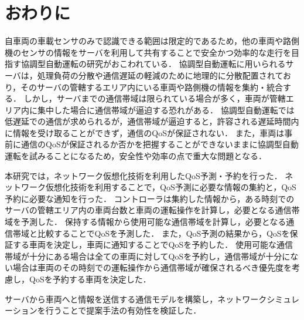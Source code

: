 \documentclass[a4paper,11pt,uplatex]{ujreport}
\begin{document}
  

\chapter{おわりに}
\label{chap:おわりに}


  自車両の車載センサのみで認識できる範囲は限定的であるため，他の車両や路側機のセンサの情報をサーバを利用して共有することで安全かつ効率的な走行を目指す協調型自動運転の研究がおこわれている．
  協調型自動運転に用いられるサーバは，処理負荷の分散や通信遅延の軽減のために地理的に分散配置されており，そのサーバの管轄するエリア内にいる車両や路側機の情報を集約・統合する．
  しかし，サーバまでの通信帯域は限られている場合が多く，車両が管轄エリア内に集中した場合に通信帯域が逼迫する恐れがある．
  協調型自動運転では低遅延での通信が求められるが，通信帯域が逼迫すると，許容される遅延時間内に情報を受け取ることができず，通信のQoSが保証されない．
  また，車両は事前に通信のQoSが保証されるか否かを把握することができないままに協調型自動運転を試みることになるため，安全性や効率の点で重大な問題となる．\par
  本研究では，ネットワーク仮想化技術を利用したQoS予測・予約を行った．
  ネットワーク仮想化技術を利用することで，QoS予測に必要な情報の集約と，QoS予約に必要な通知を行った．
  コントローラは集約した情報から，ある時刻でのサーバの管轄エリア内の車両台数と車両の運転操作を計算し，必要となる通信帯域を予測した．
  保持する情報から使用可能な通信帯域を計算し，必要となる通信帯域と比較することでQoSを予測した．
  また，QoS予測の結果から，QoSを保証する車両を決定し，車両に通知することでQoSを予約した．
  使用可能な通信帯域が十分にある場合は全ての車両に対してQoSを予約し，通信帯域が十分にない場合は車両のその時刻での運転操作から通信帯域が確保されるべき優先度を考慮し，QoSを予約する車両を決定した．\par
  サーバから車両へと情報を送信する通信モデルを構築し，ネットワークシミュレーションを行うことで提案手法の有効性を検証した．

\end{document}
